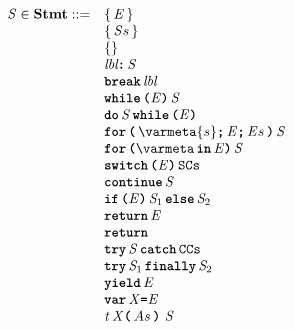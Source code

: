 \documentclass[a4paper,oneside,fleqn]{article}
\newcommand{\synt}[1]{\ensuremath{\text{\textbf{\texttt{#1}}}}}
\newcommand{\dstmt}{\mathbf{Stmt}}
\newcommand{\idmeta}{\ensuremath{\mathit{X}}}
\newcommand{\typemeta}{\ensuremath{\mathit{t}}}
\begin{document}
\newcommand{\LabeledStatement}[2]{#1\synt{:}\, #2}
\newcommand{\BreakStatement}[1]{\synt{break}\, #1}
\newcommand{\WhileStatement}[2]{\synt{while}\, \synt{(}#1\synt{)}\, #2}
\newcommand{\DoStatement}[2]{\synt{do}\, #1\, \synt{while}\, \synt{(}#2\synt{)}}
\newcommand{\ForStatement}[4]{\synt{for}\, \synt{(}\,#1\synt{;}\, #2\synt{;}\, #3\,\synt{)}\, #4}
\newcommand{\ForInStatement}[3]{\synt{for}\,\synt{(}#1\,\synt{in}\,#2\synt{)}\,#3}

\newcommand{\SwitchStatement}[2]{\synt{switch}\,\synt{(}#1\synt{)}\,#2}
\newcommand{\ContinueSwitchStatement}[1]{\synt{continue}\,#1}
\newcommand{\IfStatement}[3]{\synt{if}\,\synt{(}#1\synt{)}\,#2\,\synt{else}\,#3}
\newcommand{\ReturnStatement}[1]{\synt{return}\,#1}

\newcommand{\TryCatch}[2]{\synt{try}\,#1\,\synt{catch}\,#2}
\newcommand{\TryFinally}[2]{\synt{try}\,#1\,\synt{finally}\,#2}

\newcommand{\Yield}[1]{\synt{yield}\,#1}

\newcommand{\VarDeclaration}[2]{\synt{var}\,#1\synt{=}#2}
\newcommand{\FunctionDeclaration}[5]{#1\,#2\synt{(}\,#3\,\synt{)}\,#4\,#5}

\[
\begin{array}{rl}

  \statementmeta \in \dstmt ::=
  & \ExpressionStatement{\expressionmeta} \\
  & \Block{\statementmeta{s}} \\
  & \EmptyStatement \\
  & \LabeledStatement{\lbl}{\statementmeta} \\
  & \BreakStatement{\lbl} \\
  & \WhileStatement{\expressionmeta}{\statementmeta} \\
  & \DoStatement{\statementmeta}{\expressionmeta} \\
  & \ForStatement{\varmeta{s}}{\expressionmeta}{\expressionsmeta}{\statementmeta} \\
  & \ForInStatement{\varmeta}{\expressionmeta}{\statementmeta} \\
  & \SwitchStatement{\expressionmeta}{\tt{SCs}} \\
  & \ContinueSwitchStatement{\statementmeta} \\
  & \IfStatement{\expressionmeta}{\statementmeta_1}{\statementmeta_2} \\
  & \ReturnStatement{\expressionmeta} \\
  & \ReturnStatement{} \\
  & \TryCatch{\statementmeta}{\tt{CCs}} \\
  & \TryFinally{\statementmeta_1}{\statementmeta_2} \\
  & \Yield{\expressionmeta} \\
  & \VarDeclaration{\idmeta}{\expressionmeta} \\
  & \FunctionDeclaration{\typemeta}{\idmeta}{\formals}{}{\stmt} \\

\end{array}
\]
\end{document}

